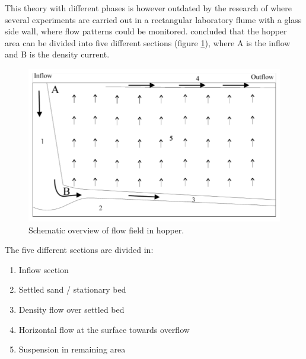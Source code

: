 \noindent This theory with different phases is however outdated by the research of \cite{Rhee} where several experiments are carried out in a rectangular laboratory flume with a glass side wall, where flow patterns could be monitored. \cite{Rhee} concluded that the hopper area can be divided into five different sections (figure \ref{fig:overview_hopper_flowfield}), where A is the inflow and B is the density current.


\begin{figure}[ht!]
    \centering
    \includegraphics[width=.6\linewidth]{Images/Overview_hopper_flowfield.png}
    \caption{Schematic overview of flow field in hopper.}
    \label{fig:overview_hopper_flowfield}
\end{figure}

\noindent The five different sections are divided in:

\begin{enumerate}
    \item Inflow section
    \item Settled sand / stationary bed
    \item Density flow over settled bed
    \item Horizontal flow at the surface towards overflow
    \item Suspension in remaining area
    
\end{enumerate}

